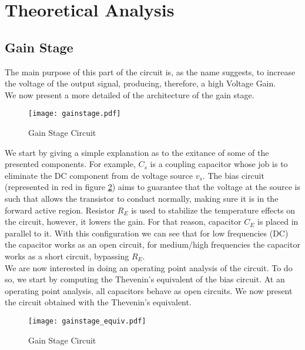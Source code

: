 \section{Theoretical Analysis}
\label{sec:theoretical}



\subsection{Gain Stage}
\par The main purpose of this part of the circuit is, as the name suggests, to increase the voltage of the output signal, producing, therefore, a high Voltage Gain.\\
We now present a more detailed of the architecture of the gain stage.

\begin{figure}[h!]
\centering
\texttt{[image: gainstage.pdf]}
\caption{Gain Stage Circuit}
\label{fig:gain stage circuit}
\end{figure}



We start by giving a simple explanation as to the exitance of some of the presented components. For example, $C_s$ is a coupling capacitor whose job is to eliminate the DC component from de voltage source $v_s$. The bias circuit (represented in red in figure \ref{fig:gain stage circuit}) aims to guarantee that the voltage at the source is such that allows the transistor to conduct normally, making sure it is in the forward active region.
Resistor $R_E$ is used to stabilize the temperature effects on the circuit, however, it lowers the gain. For that reason, capacitor $C_E$ is placed in parallel to it. With this configuration we can see that for low frequencies (DC) the capacitor works as an open circuit, for medium/high frequencies the capacitor works as a short circuit, bypassing $R_E$.\\

We are now interested in doing an operating point analysis of the circuit. To do so, we start by computing the Thevenin's equivalent of the bias circuit. At an operating point analysis, all capacitors behave as open circuits. We now present the circuit obtained with the Thevenin's equivalent.


\begin{figure}[h!]
\centering
\texttt{[image: gainstage\_equiv.pdf]}
\caption{Gain Stage Circuit}
\label{fig:gain stage circuit}
\end{figure}


